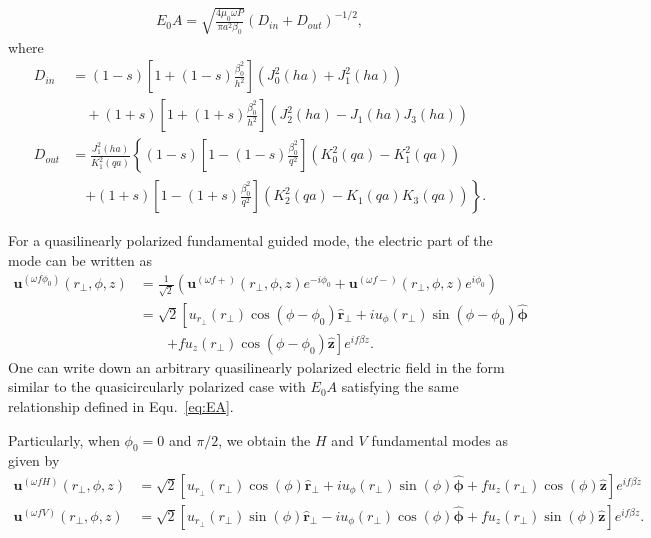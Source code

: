 \documentclass[preprint,aps,pra,onecolumn]{revtex4-1} %
\begin{document}
\begin{align}\label{eq:EA}
E_0 A=\sqrt{\frac{4\mu_0\omega P}{\pi a^2 \beta_0}}\left(D_{in} + D_{out} \right)^{-1/2},
\end{align}
where
\begin{align}
D_{in} &= (1-s)\left[ 1+(1-s)\frac{\beta_0^2}{h^2}\right] \left(J_0^2(ha) + J_1^2(ha) \right) \nonumber\\
&\quad + (1+s)\left[ 1+(1+s)\frac{\beta_0^2}{h^2}\right] \left(J_2^2(ha)- J_1(ha)J_3(ha) \right)\\
D_{out} &= \frac{J_1^2(ha)}{K_1^2(qa)}\left\{ (1-s)\left[ 1-(1-s)\frac{\beta_0^2}{q^2}\right] \left(K_0^2(qa) - K_1^2(qa) \right)\right. \nonumber\\
&\quad \left. + (1\!+\! s)\left[ 1\!-\! (1\!+\! s)\frac{\beta_0^2}{q^2}\right] \left(K_2^2(qa)\! -\! K_1(qa)K_3(qa) \right) \right\}.
\end{align}



For a quasilinearly polarized fundamental guided mode, the electric part of the mode can be written as 
\begin{align}
\mathbf{u}^{(\omega f \phi_0)}(r\!_\perp,\phi,z) &= \frac{1}{\sqrt{2}} \left(\mathbf{u}^{(\omega f +)}(r\!_\perp,\phi,z)e^{-i\phi_0} +\mathbf{u}^{(\omega f -)}(r\!_\perp,\phi,z)e^{i\phi_0} \right)\\
&= \sqrt{2}\left[u_{r\!_\perp}(r\!_\perp)\cos(\phi-\phi_0)\hat{\mathbf{r}}\!_\perp + iu_\phi(r\!_\perp)\sin(\phi-\phi_0)\hat{\boldsymbol{\phi}} \right. \nonumber \\
&\quad\quad \left. + fu_z(r\!_\perp)\cos(\phi-\phi_0)\hat{\mathbf{z}} \right]e^{if\beta z}.
\end{align}
One can write down an arbitrary quasilinearly polarized electric field in the form similar to the quasicircularly polarized case with $E_0A$ satisfying the same relationship defined in Equ.~\eqref{eq:EA}. 

Particularly, when $\phi_0=0$ and $\pi/2$, we obtain the $H$ and $V$ fundamental modes as given by
\begin{align}
\mathbf{u}^{(\omega f H)}(r\!_\perp,\phi,z)
&= \sqrt{2}\left[u_{r\!_\perp}(r\!_\perp)\cos(\phi)\hat{\mathbf{r}}\!_\perp + iu_\phi(r\!_\perp)\sin(\phi)\hat{\boldsymbol{\phi}} + fu_z(r\!_\perp)\cos(\phi)\hat{\mathbf{z}} \right]e^{if\beta z}\\
\mathbf{u}^{(\omega f V)}(r\!_\perp,\phi,z)
&= \sqrt{2}\left[u_{r\!_\perp}(r\!_\perp)\sin(\phi)\hat{\mathbf{r}}\!_\perp - iu_\phi(r\!_\perp)\cos(\phi)\hat{\boldsymbol{\phi}}  + fu_z(r\!_\perp)\sin(\phi)\hat{\mathbf{z}} \right]e^{if\beta z}.
\end{align}
\end{document}
